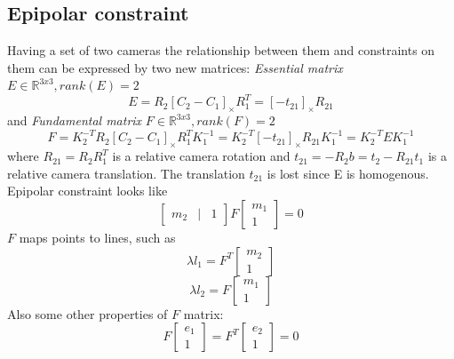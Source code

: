 \subsection{Epipolar constraint}
Having a set of two cameras the relationship between them and constraints on them can be expressed by two new matrices: 
\textit{Essential matrix} $E \in \mathbb{R}^{3x3}, rank(E) = 2$
$$
E = R_2 [C_2 - C_1]_{\times} R_1^T = [-t_{21}]_{\times}R_{21}
$$ 
and \textit{Fundamental matrix} $F \in \mathbb{R}^{3x3}, rank(F) = 2$
$$
F = K_2^{-T} R_2 [C_2 - C_1]_{\times} R_1^T K_1^{-1} = K_2^{-T} [-t_{21}]_{\times} R_{21} K_1^{-1} = K_2^{-T} E K_1^{-1}
$$
where 
$R_{21} = R_2 R_1^T$ is a relative camera rotation and 
$t_{21} = -R_2 b = t_2 - R_{21}t_1$ is a relative camera translation.
The translation $t_{21}$ is lost since E is homogenous.
Epipolar constraint looks like
$$
\begin{bmatrix} m_2 & | & 1 \end{bmatrix} F \begin{bmatrix} m_1 \\ 1 \end{bmatrix} = 0
$$
$F$ maps points to lines, such as
$$
\lambda l_1 = F^T \begin{bmatrix} m_2 \\ 1 \end{bmatrix}
$$
$$
\lambda l_2 = F \begin{bmatrix} m_1 \\ 1 \end{bmatrix}
$$
Also some other properties of $F$ matrix:
$$
F \begin{bmatrix} e_1 \\ 1 \end{bmatrix} = F^T \begin{bmatrix} e_2 \\ 1 \end{bmatrix} = 0
$$
